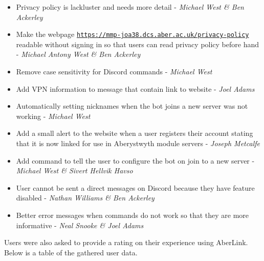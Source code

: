 \begin{itemize}
    \item Privacy policy is lackluster and needs more detail - \textit{Michael West \& Ben Ackerley}
    \item Make the webpage \href{https://mmp-joa38.dcs.aber.ac.uk/privacy-policy}{\nolinkurl{https://mmp-joa38.dcs.aber.ac.uk/privacy-policy}} readable without signing in so that users can read privacy policy before hand - \textit{Michael Antony West \& Ben Ackerley}
    \item Remove case sensitivity for Discord commands - \textit{Michael West}
    \item Add VPN information to message that contain link to website - \textit{Joel Adams}
    \item Automatically setting nicknames when the bot joins a new server was not working - \textit{Michael West}
    \item Add a small alert to the website when a user registers their account stating that it is now linked for use in Aberystwyth module servers - \textit{Joseph Metcalfe}
    \item Add command to tell the user to configure the bot on join to a new server - \textit{Michael West \& Sivert Hellvik Havso}
    \item User cannot be sent a direct messages on Discord because they have feature disabled - \textit{Nathan Williams \& Ben Ackerley}
    \item Better error messages when commands do not work so that they are more informative - \textit{Neal Snooke \& Joel Adams}
\end{itemize}

Users were also asked to provide a rating on their experience using AberLink. Below is a table of the gathered user data.

